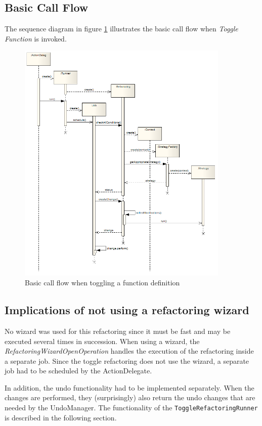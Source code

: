 \subsection{Basic Call Flow}
The sequence diagram in figure \ref{sd} illustrates the basic call flow when 
\textit{Toggle Function} is invoked.
\begin{figure}[h]
  \centering
  \includegraphics[width=0.9\textwidth]{images/sequence_diagram.png}
  \caption{Basic call flow when toggling a function definition}
  \label{sd}
\end{figure}

\subsection{Implications of not using a refactoring wizard}
No wizard was used for this refactoring since it must be fast and may be 
executed several times in succession. When using a wizard, the 
\textit{RefactoringWizardOpenOperation} handles the execution of the refactoring 
inside a separate job. Since the toggle refactoring does not use the wizard, a 
separate job had to be scheduled by the ActionDelegate.

In addition, the undo functionality had to be implemented separately. When the 
changes are performed, they (surprisingly) also return the undo changes that are 
needed by the UndoManager. The functionality of the 
\texttt{ToggleRefactoringRunner} is described in the following section.

